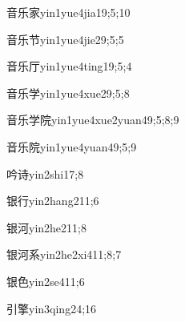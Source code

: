 \begin{verbete}{音乐家}{yin1yue4jia1}{9;5;10}
\end{verbete}

\begin{verbete}{音乐节}{yin1yue4jie2}{9;5;5}
\end{verbete}

\begin{verbete}{音乐厅}{yin1yue4ting1}{9;5;4}
\end{verbete}

\begin{verbete}{音乐学}{yin1yue4xue2}{9;5;8}
\end{verbete}

\begin{verbete}{音乐学院}{yin1yue4xue2yuan4}{9;5;8;9}
\end{verbete}

\begin{verbete}{音乐院}{yin1yue4yuan4}{9;5;9}
\end{verbete}

\begin{verbete}{吟诗}{yin2shi1}{7;8}
\end{verbete}

\begin{verbete}{银行}{yin2hang2}{11;6}
\end{verbete}

\begin{verbete}{银河}{yin2he2}{11;8}
\end{verbete}

\begin{verbete}{银河系}{yin2he2xi4}{11;8;7}
\end{verbete}

\begin{verbete}{银色}{yin2se4}{11;6}
\end{verbete}

\begin{verbete}{引擎}{yin3qing2}{4;16}
\end{verbete}

